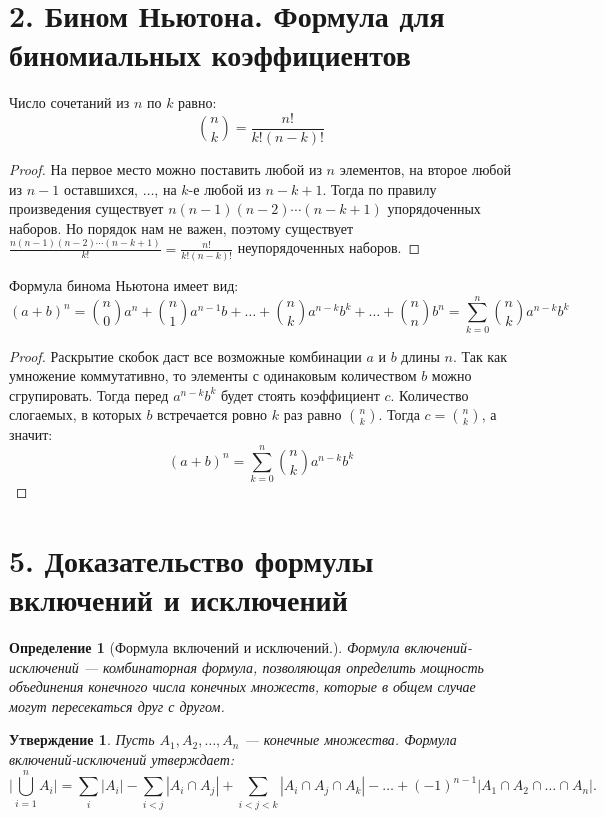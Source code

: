 \documentclass[a4paper,12pt]{article}
\newtheorem*{defin}{Определение}
\newtheorem*{state}{Утверждение}
\begin{document}
 	\section*{2. Бином Ньютона. Формула для биномиальных коэффициентов}
    Число сочетаний из $n$ по $k$ равно:
    \[
        \binom{n}{k} = \frac{n!}{k!(n - k)!}
    \]
    \begin{proof}
        На первое место можно поставить любой из $n$ элементов, на второе любой из $n - 1$ оставшихся, $\ldots$, на $k$-е любой из $n - k + 1$. Тогда по правилу произведения существует $n(n - 1)(n - 2)\cdots(n - k + 1)$ упорядоченных наборов. Но порядок нам не важен, поэтому существует $\displaystyle\frac{n(n - 1)(n - 2)\cdots(n - k + 1)}{k!} = \frac{n!}{k!(n - k)!}$ неупорядоченных наборов.
    \end{proof}
    Формула бинома Ньютона имеет вид:
    \[
        (a + b)^{n} = \binom{n}{0}a^{n} + \binom{n}{1}a^{n - 1}b + \ldots + \binom{n}{k}a^{n - k}b^{k} + \ldots + \binom{n}{n}b^{n} = \sum_{k = 0}^{n}\binom{n}{k}a^{n - k}b^{k}
    \]
    \begin{proof}
        Раскрытие скобок даст все возможные комбинации $a$ и $b$ длины $n$. Так как умножение коммутативно, то элементы с одинаковым количеством $b$ можно сгрупировать. Тогда перед $a^{n - k}b^{k}$ будет стоять коэффициент $c$. Количество слогаемых, в которых $b$ встречается ровно $k$ раз равно $\displaystyle\binom{n}{k}$. Тогда $c = \displaystyle\binom{n}{k}$, а значит:
        \[
            (a + b)^{n} = \sum_{k = 0}^{n}\binom{n}{k}a^{n - k}b^{k}
        \]
    \end{proof}
    \pagebreak %

 	\section*{5. Доказательство формулы включений и исключений}
 	\begin{defin} [Формула включений и исключений.] Формула включений-исключений — комбинаторная формула, позволяющая определить мощность объединения конечного числа конечных множеств, которые в общем случае могут пересекаться друг с другом.
 	\end{defin}
 	\begin{state}
		Пусть $ A_{1}, A_{2},\ldots , A_{n} $ — конечные множества. Формула включений-исключений утверждает:
		$$\biggl | \bigcup_{i=1}^{n}A_i \biggl | =
		 \sum_{i} | A_i | - \sum_{i<j} | A_i \cap A_j | + \sum_{i<j<k} | A_i \cap A_j \cap A_k | - \ldots + (-1)^{n-1} | A_1 \cap A_2 \cap \ldots \cap A_n |.$$
 	\end{state}
\end{document}
